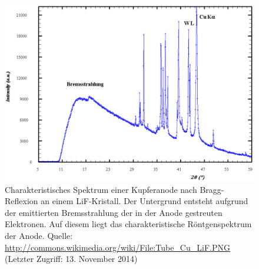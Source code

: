 \documentclass[11pt, a4paper]{article}
\begin{document}
\begin{figure}[h]
  \centering
  \includegraphics[width=1\textwidth]{./grafiken/Tube_Cu_LiF.pdf}
  \caption{Charakteristisches Spektrum einer Kupferanode nach Bragg-Reflexion an einem LiF-Kristall. Der Untergrund entsteht aufgrund der emittierten Bremsstrahlung der in der Anode gestreuten Elektronen. Auf diesem liegt das charakteristische Röntgenspektrum der Anode. Quelle: \url{http://commons.wikimedia.org/wiki/File:Tube_Cu_LiF.PNG} (Letzter Zugriff: 13. November 2014)}
  \label{fig:spektrum}
\end{figure}
\end{document}
